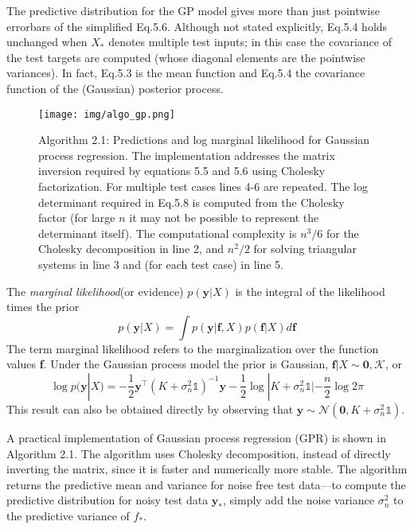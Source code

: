 \documentclass[twoside]{article}
\begin{document}
The predictive distribution for the GP model gives more than just pointwise errorbars of the simplified Eq.5.6. Although not stated explicitly, Eq.5.4 holds unchanged when $X_*$ denotes multiple test inputs; in this case the covariance of the test targets are computed (whose diagonal elements are the pointwise variances). In fact, Eq.5.3 is the mean function and Eq.5.4 the covariance function of the (Gaussian) posterior process.
\newpage
\begin{figure}[ht]
\caption{Algorithm 2.1: Predictions and log marginal likelihood for Gaussian process regression. The implementation addresses the matrix inversion required by equations 5.5 and 5.6 using Cholesky factorization. For multiple test cases lines 4-6 are repeated. The log determinant required in Eq.5.8 is computed from the Cholesky factor (for large $n$ it may not be possible to represent the determinant itself). The computational complexity is $n^3/6$ for the Cholesky decomposition in line 2, and $n^2/2$ for solving triangular systems in line 3 and (for each test case) in line 5.}
\centering
\texttt{[image: img/algo\_gp.png]}
\end{figure}
The \textit{marginal likelihood}(or evidence) $p(\boldsymbol{y}|X)$ is the integral of the likelihood times the prior
\begin{equation*}
    p(\boldsymbol{y}|X) = \int p(\boldsymbol{y}|\textbf{f},X)p(\textbf{f}|X)d\textbf{f}
\end{equation*}
The term marginal likelihood refers to the marginalization over the function values \textbf{f}. Under the Gaussian process model the prior is Gaussian, $\textbf{f}|X \sim \mathcal{\boldsymbol{0}, K}$, or
\begin{equation}
    \log p(\boldsymbol{y}|X) = -\frac{1}{2}\boldsymbol{y}^\intercal(K + \sigma^2_n\mathds{1})^{-1}\boldsymbol{y} -\frac{1}{2}\log|K + \sigma^2_n\mathds{1}| -\frac{n}{2}\log2\pi
\end{equation}
This result can also be obtained directly by observing that $\boldsymbol{y} \sim \mathcal{N}(\boldsymbol{0}, K + \sigma^2_n\mathds{1})$.\medskip

A practical implementation of Gaussian process regression (GPR) is shown in Algorithm 2.1. The algorithm uses Cholesky decomposition, instead of directly inverting the matrix, since it is faster and numerically more stable. The algorithm returns the predictive mean and variance for noise free test data—to compute the predictive distribution for noisy test data $\boldsymbol{y}_*$, simply add the noise variance $    \sigma^2_n$ to the predictive variance of $f_*$.
\end{document}
